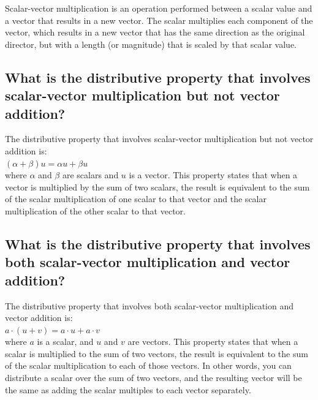 \documentclass[
  letterpaper,
  DIV=11,
  numbers=noendperiod]{scrartcl}
\begin{document}
Scalar-vector multiplication is an operation performed between a scalar
value and a vector that results in a new vector. The scalar multiplies
each component of the vector, which results in a new vector that has the
same direction as the original director, but with a length (or
magnitude) that is scaled by that scalar value.

\hypertarget{what-is-the-distributive-property-that-involves-scalar-vector-multiplication-but-not-vector-addition}{%
\subsection{What is the distributive property that involves
scalar-vector multiplication but not vector
addition?}\label{what-is-the-distributive-property-that-involves-scalar-vector-multiplication-but-not-vector-addition}}

The distributive property that involves scalar-vector multiplication but
not vector addition is:\\
\((\alpha + \beta)u = \alpha u + \beta u\)\\
where \(\alpha\) and \(\beta\) are scalars and \(u\) is a vector. This
property states that when a vector is multiplied by the sum of two
scalars, the result is equivalent to the sum of the scalar
multiplication of one scalar to that vector and the scalar
multiplication of the other scalar to that vector.

\hypertarget{what-is-the-distributive-property-that-involves-both-scalar-vector-multiplication-and-vector-addition}{%
\subsection{What is the distributive property that involves both
scalar-vector multiplication and vector
addition?}\label{what-is-the-distributive-property-that-involves-both-scalar-vector-multiplication-and-vector-addition}}

The distributive property that involves both scalar-vector
multiplication and vector addition is:\\
\(a \cdot (u + v) = a \cdot u + a \cdot v\)\\
where \(a\) is a scalar, and \(u\) and \(v\) are vectors. This property
states that when a scalar is multiplied to the sum of two vectors, the
result is equivalent to the sum of the scalar multiplication to each of
those vectors. In other words, you can distribute a scalar over the sum
of two vectors, and the resulting vector will be the same as adding the
scalar multiples to each vector separately.
\end{document}
